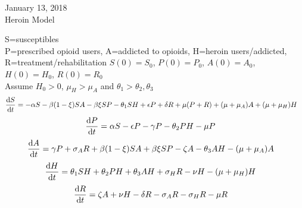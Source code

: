 \documentclass[12pt]{article}
\begin{document}

January 13, 2018 \\
Heroin Model 


S=susceptibles\\
P=prescribed opioid users,
A=addicted to opioids, 
H=heroin users/addicted,
R=treatment/rehabilitation 
$S(0)=S_{0}$, $P(0)=P_{0}$, $A(0)=A_{0}$, $H(0)=H_{0}$, $R(0)=R_{0}$ \\
Assume $H_{0}>0$, $\mu_{H} > \mu_{A}$ and $\theta_{1} > \theta_{2}, \theta_{3}$ 
\[\dv{S}{t} = -\alpha S - \beta (1- \xi) SA  -\beta \xi SP- \theta_{1} SH +\epsilon P +\delta R +\mu (P+R) + (\mu+\mu_{A})A + (\mu+\mu_{H}) H \quad\]
\[\dv{P}{t} = \alpha S - \epsilon P  - \gamma P - \theta_{2}PH- \mu P    \quad\]
\[\dv{A}{t} = \gamma P + \sigma_{A} R +\beta (1- \xi) SA  +\beta \xi SP -\zeta A - \theta_{3}AH-(\mu + \mu_{A})A   \quad\]
\[\dv{H}{t} = \theta_{1}SH+\theta_{2}PH+\theta_{3}AH + \sigma_{H}R-\nu H-(\mu+\mu_{H})H  \quad\]
\[\dv{R}{t} = \zeta A +\nu H -\delta R -\sigma_{A}R-\sigma_{H}R -\mu R\quad\]
\end{document}
